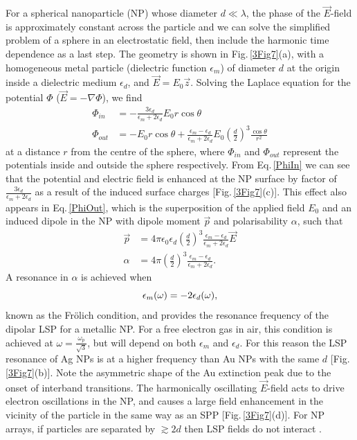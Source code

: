 For a spherical nanoparticle (NP) whose diameter $d\ll\lambda$, the phase of the $\vec{E}$-field is approximately constant across the particle and we can solve the simplified problem of a sphere in an electrostatic field, then include the harmonic time dependence as a last step. The geometry is shown in Fig.\,\ref{3Fig7}(a), with a homogeneous metal particle (dielectric function $\epsilon_m$) of diameter $d$ at the origin inside a dielectric medium $\epsilon_d$, and $\vec{E} = E_0\vec{z}$. Solving the Laplace equation for the potential $\Phi$ ($\vec{E} = -\nabla\Phi$), we find
\begin{subequations}
\label{NPlaplace}
\begin{align}
\Phi_{in} &= -\frac{3\epsilon_d}{\epsilon_m+2\epsilon_d}E_0r\cos\theta \label{PhiIn}\\
\Phi_{out} &= -E_0r\cos\theta+\frac{\epsilon_m-\epsilon_d}{\epsilon_m+2\epsilon_d}E_0\left(\frac{d}{2}\right)^3\frac{\cos\theta}{r^2} \label{PhiOut}
\end{align}
\end{subequations}
at a distance $r$ from the centre of the sphere, where $\Phi_{in}$ and $\Phi_{out}$ represent the potentials inside and outside the sphere respectively. From Eq.\,\ref{PhiIn} we can see that the potential and electric field is enhanced at the NP surface by factor of $\frac{3\epsilon_d}{\epsilon_m+2\epsilon_d}$ as a result of the induced surface charges [Fig.\,\ref{3Fig7}(c)]. This effect also appears in Eq.\,\ref{PhiOut}, which is the superposition of the applied field $E_0$ and an induced dipole in the NP with dipole moment $\vec{p}$ and polarisability $\alpha$, such that
\begin{subequations}
\label{NPdipole}
\begin{align}
\vec{p} &=4\pi\epsilon_0\epsilon_d\left(\frac{d}{2}\right)^3\frac{\epsilon_m-\epsilon_d}{\epsilon_m+2\epsilon_d}\vec{E} \label{NPmoment}\\
\alpha &= 4\pi\left(\frac{d}{2}\right)^3\frac{\epsilon_m-\epsilon_d}{\epsilon_m+2\epsilon_d} \label{NPpolarisability} .
\end{align}
\end{subequations}
A resonance in $\alpha$ is achieved when 
\begin{equation}
\centering
\epsilon_m(\omega) = -2\epsilon_d(\omega) ,
\label{Frolich}
\end{equation}
known as the Fr\"{o}lich condition, and provides the resonance frequency of the dipolar LSP for a metallic NP. For a free electron gas in air, this condition is achieved at $\omega = \frac{\omega_p}{\sqrt{3}}$, but will depend on both $\epsilon_m$ and $\epsilon_d$. For this reason the LSP resonance of Ag NPs is at a higher frequency than Au NPs with the same $d$ [Fig.\,\ref{3Fig7}(b)]. Note the asymmetric shape of the Au extinction peak due to the onset of interband transitions. The harmonically oscillating $\vec{E}$-field acts to drive electron oscillations in the NP, and causes a large field enhancement in the vicinity of the particle in the same way as an SPP [Fig.\,\ref{3Fig7}(d)]. For NP arrays, if particles are separated by $\gtrsim2d$ then LSP fields do not interact \cite{Rechberger2003}.
